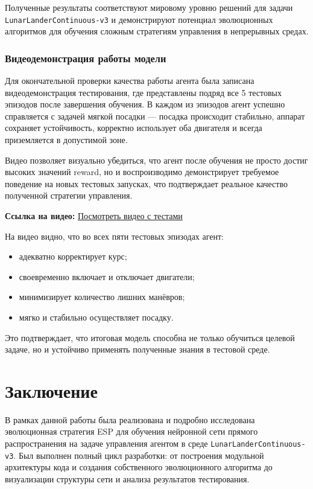\documentclass[a4paper,12pt]{article}
\begin{document}
Полученные результаты соответствуют мировому уровню решений для задачи \texttt{LunarLanderContinuous-v3} и демонстрируют потенциал эволюционных алгоритмов для обучения сложным стратегиям управления в непрерывных средах.

\subsubsection{Видеодемонстрация работы модели}

Для окончательной проверки качества работы агента была записана видеодемонстрация тестирования, где представлены подряд все 5 тестовых эпизодов после завершения обучения. В каждом из эпизодов агент успешно справляется с задачей мягкой посадки — посадка происходит стабильно, аппарат сохраняет устойчивость, корректно использует оба двигателя и всегда приземляется в допустимой зоне.

Видео позволяет визуально убедиться, что агент после обучения не просто достиг высоких значений reward, но и воспроизводимо демонстрирует требуемое поведение на новых тестовых запусках, что подтверждает реальное качество полученной стратегии управления.

\textbf{Ссылка на видео:} 
\href{https://drive.google.com/file/d/1ktwg2IDhtKPYz6kOzJnHerPcm4x3vGTp/view?usp=drive_link}
{Посмотреть видео с тестами}

На видео видно, что во всех пяти тестовых эпизодах агент:
\begin{itemize}
	\item адекватно корректирует курс;
	\item своевременно включает и отключает двигатели;
	\item минимизирует количество лишних манёвров;
	\item мягко и стабильно осуществляет посадку.
\end{itemize}

Это подтверждает, что итоговая модель способна не только обучиться целевой задаче, но и устойчиво применять полученные знания в тестовой среде.
\newpage
\section{Заключение}

В рамках данной работы была реализована и подробно исследована эволюционная стратегия ESP для обучения нейронной сети прямого распространения на задаче управления агентом в среде \texttt{LunarLanderContinuous-v3}. Был выполнен полный цикл разработки: от построения модульной архитектуры кода и создания собственного эволюционного алгоритма до визуализации структуры сети и анализа результатов тестирования.
\end{document}
